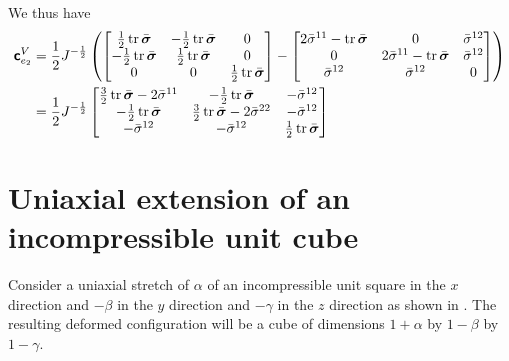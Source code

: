 We thus have
\begin{equation}
  \begin{split}
    \tensorfour{c}_{e_{2}}^{V}&=\dfrac{1}{2}J^{-\frac{1}{2}}\pbrac{\begin{bmatrix}
        \frac{1}{2}\trace{}{\bar{\tensor{\sigma}}} & -\frac{1}{2}\trace{}{\bar{\tensor{\sigma}}} & 0 \\
        -\frac{1}{2}\trace{}{\bar{\tensor{\sigma}}} & \frac{1}{2}\trace{}{\bar{\tensor{\sigma}}} & 0 \\
        0 & 0 & \frac{1}{2}\trace{}{\bar{\tensor{\sigma}}}
      \end{bmatrix}-\begin{bmatrix}
      2\bar{\sigma}^{11}-\trace{}{\bar{\tensor{\sigma}}} & 0 & \bar{\sigma}^{12}
      \\
      0 & 2\bar{\sigma}^{11}-\trace{}{\bar{\tensor{\sigma}}} & \bar{\sigma}^{12}
      \\
      \bar{\sigma}^{12} & \bar{\sigma}^{12} & 0
    \end{bmatrix}}\\
    &=\dfrac{1}{2}J^{-\frac{1}{2}}\begin{bmatrix}
      \frac{3}{2}\trace{}{\bar{\tensor{\sigma}}}-2\bar{\sigma}^{11} &
      -\frac{1}{2}\trace{}{\bar{\tensor{\sigma}}} & -\bar{\sigma}^{12} \\
      -\frac{1}{2}\trace{}{\bar{\tensor{\sigma}}} &
      \frac{3}{2}\trace{}{\bar{\tensor{\sigma}}}-2\bar{\sigma}^{22} &
      -\bar{\sigma}^{12} \\
      -\bar{\sigma}^{12} & -\bar{\sigma}^{12} &
      \frac{1}{2}\trace{}{\bar{\tensor{\sigma}}}
    \end{bmatrix}
  \end{split}
\end{equation}

\section{Uniaxial extension of an incompressible unit cube}

Consider a uniaxial stretch of $\alpha$ of an incompressible unit
square in the $x$ direction and $-\beta$ in the $y$ direction and
$-\gamma$ in the $z$ direction as shown in
. The resulting deformed
configuration will be a cube of dimensions $1+\alpha$ by $1-\beta$ by
$1-\gamma$.


